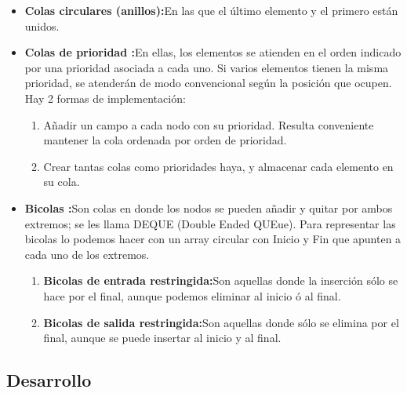 \documentclass[twoside,twocolumn]{article}
\begin{document}
	\begin{itemize}
		\item \textbf{Colas circulares (anillos):}En las que el último elemento y el primero están unidos. \\
		
		\item \textbf{Colas de prioridad :}En ellas, los elementos se atienden en el orden indicado por una prioridad asociada a cada uno. Si varios elementos tienen la misma prioridad, se atenderán de modo convencional según la posición que ocupen. \\
		
		Hay 2 formas de implementación: 
		\begin{enumerate}
			\item Añadir un campo a cada nodo con su prioridad. Resulta conveniente mantener la cola ordenada por orden de prioridad. 
			\item Crear tantas colas como prioridades haya, y almacenar cada elemento en su cola. 
		\end{enumerate}
		\item \textbf{Bicolas :}Son colas en donde los nodos se pueden añadir y quitar por ambos extremos; se les llama DEQUE (Double Ended QUEue). Para representar las bicolas lo podemos hacer con un array circular con Inicio y Fin que apunten a cada uno de los extremos. 
		\begin{enumerate}
			\item \textbf{Bicolas de entrada restringida:}Son aquellas donde la inserción sólo se hace por el final, aunque podemos eliminar al inicio ó al final. 
			\item \textbf{Bicolas de salida restringida:}Son aquellas donde sólo se elimina por el final, aunque se puede insertar al inicio y al final.
		\end{enumerate}
		
	\end{itemize}
	
	
	\subsection{Desarrollo}
	
\end{document}
